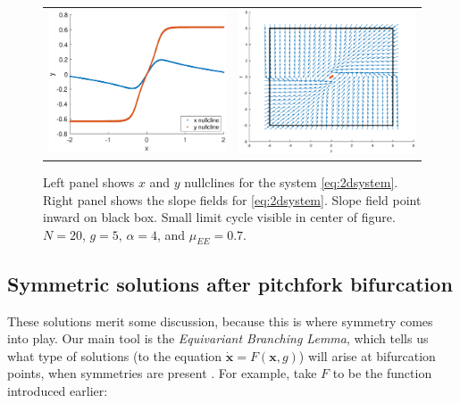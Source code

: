\documentclass[11pt,reqno]{amsart}
\newcommand{\xvec}{\mathbf{x}}
\begin{document}
\begin{figure}
    \centering
    \begin{tabular}{cc}
    \includegraphics[width=8cm]{images/nullclines.eps} &
    \includegraphics[width=8cm]{images/trappingregion.eps}
    \end{tabular}
    \caption{Left panel shows $x$ and $y$ nullclines for the system \cref{eq:2dsystem}. Right panel shows the slope fields for \cref{eq:2dsystem}. Slope field point inward on black box. Small limit cycle visible in center of figure. $N = 20$, $g = 5$, $\alpha = 4$, and $\mu_{EE} = 0.7$.}
    \label{fig:nullclines}
\end{figure}




\subsection{Symmetric solutions after pitchfork bifurcation}
These solutions merit some discussion, because this is where symmetry comes into play. 
 Our main tool is the \textit{Equivariant Branching Lemma}, which tells us what type of solutions (to the equation $\dot{\xvec} = F(\xvec, g)$) will arise at bifurcation points, when symmetries are present \cite{MR631456,GSS88Vol2,HoyleRebeccaB2006Pf:a}. For example, take $F$ to be the function introduced earlier: 
\end{document}
